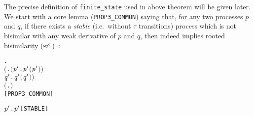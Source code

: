 The precise definition of \texttt{finite_state} used in above theorem
will be given later. We start with a core lemma (\texttt{PROP3_COMMON}) saying that, for
any two processes $p$ and $q$, if there exists a \emph{stable}
(i.e.~without $\tau$ transitions)
 process which is not bisimilar with any weak derivative of $p$ and
 $q$, then  indeed implies rooted bisimilarity
 ($\mathrel{\approx^{\rm{c}}}$)~\cite{van2005characterisation,Tian:2017wrba}:
\begin{alltt}
\HOLTokenTurnstile{} \HOLSymConst{\HOLTokenForall{}} .
     \ensuremath{(}\HOLSymConst{\HOLTokenExists{}}.   \HOLSymConst{\HOLTokenConj{}} \ensuremath{(}\HOLSymConst{\HOLTokenForall{}}\ensuremath{\HOLBoundVar{p}\sp{\prime{}}} .  \HOLTokenWeakTransBegin{}\HOLTokenWeakTransEnd \ensuremath{\HOLBoundVar{p}\sp{\prime{}}} \HOLSymConst{\HOLTokenImp{}} \HOLSymConst{\HOLTokenNeg{}}\ensuremath{(}\ensuremath{\HOLBoundVar{p}\sp{\prime{}}} \HOLSymConst{\HOLTokenWeakEQ} \ensuremath{)}\ensuremath{)} \HOLSymConst{\HOLTokenConj{}}
          \HOLSymConst{\HOLTokenForall{}}\ensuremath{\HOLBoundVar{q}\sp{\prime{}}} .  \HOLTokenWeakTransBegin{}\HOLTokenWeakTransEnd \ensuremath{\HOLBoundVar{q}\sp{\prime{}}} \HOLSymConst{\HOLTokenImp{}} \HOLSymConst{\HOLTokenNeg{}}\ensuremath{(}\ensuremath{\HOLBoundVar{q}\sp{\prime{}}} \HOLSymConst{\HOLTokenWeakEQ} \ensuremath{)}\ensuremath{)} \HOLSymConst{\HOLTokenImp{}}
     \ensuremath{(}\HOLSymConst{\HOLTokenForall{}}.  \HOLSymConst{\ensuremath{+}}  \HOLSymConst{\HOLTokenWeakEQ}  \HOLSymConst{\ensuremath{+}} \ensuremath{)} \HOLSymConst{\HOLTokenImp{}}
      \HOLSymConst{\HOLTokenObsCongr} \hfill{[PROP3_COMMON]}
\end{alltt}
\begin{alltt}
     \HOLTokenDefEquality{} \HOLSymConst{\HOLTokenForall{}} \ensuremath{\HOLBoundVar{p}\sp{\prime{}}}.  \HOLTokenTransBegin{}\HOLTokenTransEnd \ensuremath{\HOLBoundVar{p}\sp{\prime{}}} \HOLSymConst{\HOLTokenImp{}}  \HOLSymConst{\HOLTokenNotEqual{}} \HOLSymConst{\ensuremath{\tau}}\hfill{[STABLE]}
\end{alltt}

